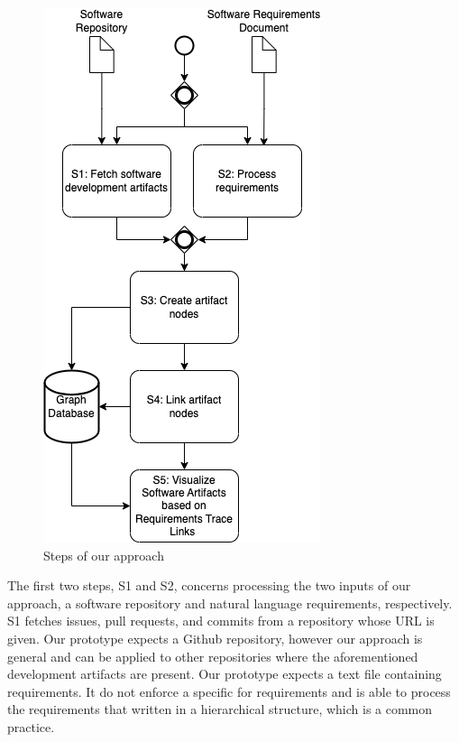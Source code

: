 \begin{figure}[htb]
    \centering
    \includegraphics[width=0.65\linewidth]{figs/approach.png}
    \caption{Steps of our approach}
    \label{fig:sys-flow}
  \end{figure}

  The first two steps, \textsf{S1} and \textsf{S2}, concerns processing the two inputs of our approach, a software repository and natural language requirements, respectively. \textsf{S1} fetches issues, pull requests, and commits from a repository whose URL is given. Our prototype expects a Github repository, however our approach is general and can be applied to other repositories where the aforementioned development artifacts are present. %
  Our prototype expects a text file containing requirements. It do not enforce a specific for requirements and is able to process the requirements that written in a hierarchical structure, which is a common practice.

